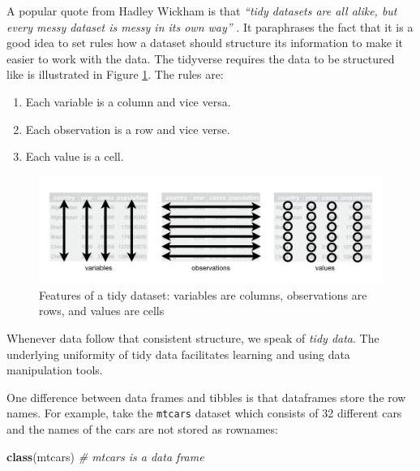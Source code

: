 \documentclass[
  12pt,
  oneside]{book}
\newenvironment{Shaded}{\begin{snugshade}}{\end{snugshade}}
\newcommand{\CommentTok}[1]{\textcolor[rgb]{0.56,0.35,0.01}{\textit{#1}}}
\newcommand{\FunctionTok}[1]{\textcolor[rgb]{0.13,0.29,0.53}{\textbf{#1}}}
\newcommand{\NormalTok}[1]{#1}
\providecommand{\tightlist}{%
  \setlength{\itemsep}{0pt}\setlength{\parskip}{0pt}}
\theoremstyle{definition}
\theoremstyle{definition}
\theoremstyle{definition}
\theoremstyle{definition}
\theoremstyle{remark}
\begin{document}
A popular quote from Hadley Wickham is that \emph{``tidy datasets are all alike, but every messy dataset is messy in its own way''} \citep[p.~2]{Hadley2014Tidy}. It paraphrases the fact that it is a good idea to set rules how a dataset should structure its information to make it easier to work with the data. The tidyverse requires the data to be structured like is illustrated in Figure \ref{fig:tidy-1}. The rules are:

\begin{enumerate}
\def\labelenumi{\arabic{enumi}.}
\tightlist
\item
  Each variable is a column and vice versa.
\item
  Each observation is a row and vice verse.
\item
  Each value is a cell.
\end{enumerate}

\begin{figure}
\centering
\includegraphics[width=1\textwidth,height=\textheight]{fig/tidy-1.png}
\caption[\label{fig:tidy-1} Features of a tidy dataset: variables are columns, observations are rows, and values are cells]{\label{fig:tidy-1} Features of a tidy dataset: variables are columns, observations are rows, and values are cells\footnotemark{}}
\end{figure}

Whenever data follow that consistent structure, we speak of \emph{tidy data}. The underlying uniformity of tidy data facilitates learning and using data manipulation tools.

One difference between data frames and tibbles is that dataframes store the row names. For example, take the \texttt{mtcars} dataset which consists of 32 different cars and the names of the cars are not stored as rownames:

\begin{Shaded}
\begin{Highlighting}[]
\FunctionTok{class}\NormalTok{(mtcars) }\CommentTok{\# mtcars is a data frame}
\end{Highlighting}
\end{Shaded}
\end{document}
